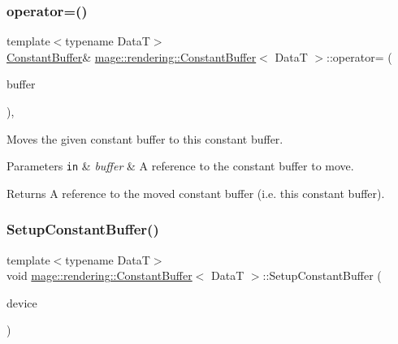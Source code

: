 \subsubsection{\texorpdfstring{operator=()}{operator=()}\hspace{0.1cm}{\footnotesize\ttfamily [2/2]}}
{\footnotesize\ttfamily template$<$typename DataT$>$ \\
\mbox{\hyperlink{classmage_1_1rendering_1_1_constant_buffer}{Constant\+Buffer}}\& \mbox{\hyperlink{classmage_1_1rendering_1_1_constant_buffer}{mage\+::rendering\+::\+Constant\+Buffer}}$<$ DataT $>$\+::operator= (\begin{DoxyParamCaption}\item[{\mbox{\hyperlink{classmage_1_1rendering_1_1_constant_buffer}{Constant\+Buffer}}$<$ DataT $>$ \&\&}]{buffer }\end{DoxyParamCaption})\hspace{0.3cm}{\ttfamily [default]}, {\ttfamily [noexcept]}}

Moves the given constant buffer to this constant buffer.


\begin{DoxyParams}[1]{Parameters}
\mbox{\tt in}  & {\em buffer} & A reference to the constant buffer to move. \\
\hline
\end{DoxyParams}
\begin{DoxyReturn}{Returns}
A reference to the moved constant buffer (i.\+e. this constant buffer). 
\end{DoxyReturn}
\mbox{\label{classmage_1_1rendering_1_1_constant_buffer_a65ce186b87c489bd3bf4e9f7c47c5ac7}} 
\subsubsection{\texorpdfstring{Setup\+Constant\+Buffer()}{SetupConstantBuffer()}}
{\footnotesize\ttfamily template$<$typename DataT$>$ \\
void \mbox{\hyperlink{classmage_1_1rendering_1_1_constant_buffer}{mage\+::rendering\+::\+Constant\+Buffer}}$<$ DataT $>$\+::Setup\+Constant\+Buffer (\begin{DoxyParamCaption}\item[{I\+D3\+D11\+Device \&}]{device }\end{DoxyParamCaption})\hspace{0.3cm}{\ttfamily [private]}}

